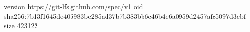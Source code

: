 version https://git-lfs.github.com/spec/v1
oid sha256:7b13f1645de405983be285ad37b7b383bb6c46b4e6a0959d2457afc5097d3cbf
size 423122
